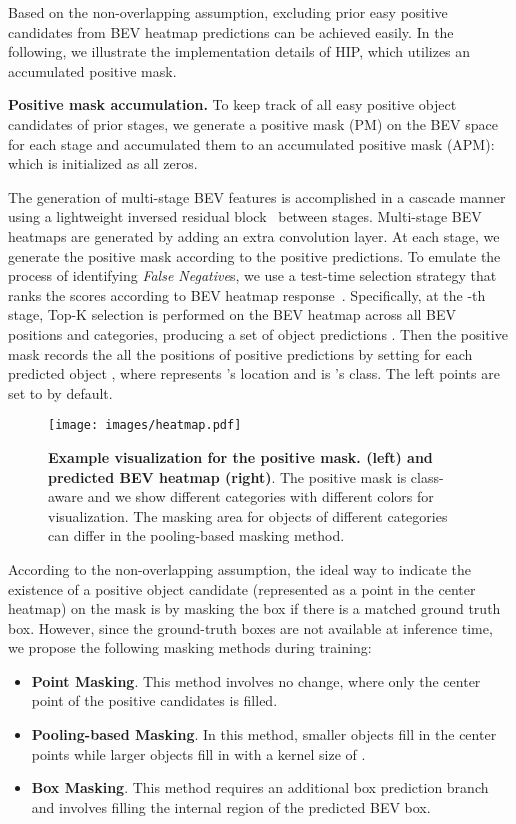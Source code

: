 \documentclass[10pt,twocolumn,letterpaper]{article}
\begin{document}
Based on the non-overlapping assumption, excluding prior easy positive candidates from BEV heatmap predictions can be achieved easily. In the following, we illustrate the implementation details of HIP, which utilizes an accumulated positive mask.

\vspace{1mm}
\noindent\textbf{Positive mask accumulation.}
To keep track of all easy positive object candidates of prior stages, we generate a positive mask (PM) on the BEV space for each stage and accumulated them to an accumulated positive mask (APM):
 which is initialized as all zeros. 

The generation of multi-stage BEV features is accomplished in a cascade manner using a lightweight inversed residual block~\cite{sandler2018mobilenetv2} between stages. Multi-stage BEV heatmaps are generated by adding an extra convolution layer. At each stage, we generate the positive mask according to the positive predictions. To emulate the process of identifying \textit{False Negative}s, we use a test-time selection strategy that ranks the scores according to BEV heatmap response~\cite{transfusion, centerpoint}. Specifically, at the -th stage, Top-K selection is performed on the BEV heatmap across all BEV positions and categories, producing a set of object predictions . Then the positive mask  records the all the positions of positive predictions by setting  for each predicted object , where  represents 's location and  is 's class. The left points are set to  by default.



\begin{figure}[t]
	\begin{center}
		\texttt{[image: images/heatmap.pdf]}
	\end{center}
	\caption{\textbf{Example visualization for the positive mask. (left) and predicted BEV heatmap (right)}. The positive mask is class-aware and we show different categories with different colors for visualization. The masking area for objects of different categories can differ in the pooling-based masking method.}
	\label{fig:heatmap}
\end{figure}

According to the non-overlapping assumption, the ideal way to indicate the existence of a positive object candidate (represented as a point in the center heatmap) on the mask is by masking the box if there is a matched ground truth box. However, since the ground-truth boxes are not available at inference time, we propose the following masking methods during training:
\begin{itemize}
    \item \textbf{Point Masking}. This method involves no change, where only the center point of the positive candidates is filled.
    \item \textbf{Pooling-based Masking}. In this method, smaller objects fill in the center points while larger objects fill in with a kernel size of .
    \item \textbf{Box Masking}. This method requires an additional box prediction branch and involves filling the internal region of the predicted BEV box.
\end{itemize}
\end{document}
